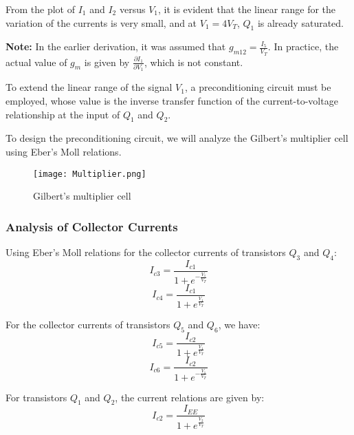 \documentclass[a4paper,9pt,twoside,openany,twocolumn]{memoir}
\begin{document}
From the plot of \( I_1 \) and \( I_2 \) versus \( V_1 \), it is evident that the linear range for the variation of the currents is very small, and at \( V_1 = 4V_T \), \( Q_1 \) is already saturated.

\textbf{Note:} In the earlier derivation, it was assumed that \( g_{m12} = \frac{I_5}{V_T} \). In practice, the actual value of \( g_m \) is given by \( \frac{\partial I_1}{\partial V_1} \), which is not constant.

To extend the linear range of the signal \( V_1 \), a preconditioning circuit must be employed, whose value is the inverse transfer function of the current-to-voltage relationship at the input of \( Q_1 \) and \( Q_2 \). 

To design the preconditioning circuit, we will analyze the Gilbert’s multiplier cell using Eber’s Moll relations.

\begin{figure}[h!]
    \centering
    \texttt{[image: Multiplier.png]}
    \caption{Gilbert’s multiplier cell}
    \label{fig:multiplier}
\end{figure}

\subsubsection{Analysis of Collector Currents}

Using Eber’s Moll relations for the collector currents of transistors \( Q_3 \) and \( Q_4 \):
\begin{equation}
I_{c3} = \frac{I_{c1}}{1 + e^{-\frac{V_1}{V_T}}} \tag{1}
\end{equation}
\begin{equation}
I_{c4} = \frac{I_{c1}}{1 + e^{\frac{V_1}{V_T}}} \tag{2}
\end{equation}

For the collector currents of transistors \( Q_5 \) and \( Q_6 \), we have:
\begin{equation}
I_{c5} = \frac{I_{c2}}{1 + e^{\frac{V_1}{V_T}}} \tag{3}
\end{equation}
\begin{equation}
I_{c6} = \frac{I_{c2}}{1 + e^{-\frac{V_1}{V_T}}} \tag{4}
\end{equation}

For transistors \( Q_1 \) and \( Q_2 \), the current relations are given by:
\begin{equation}
I_{c2} = \frac{I_{EE}}{1 + e^{\frac{V_2}{V_T}}} \tag{5}
\end{equation}
\end{document}
